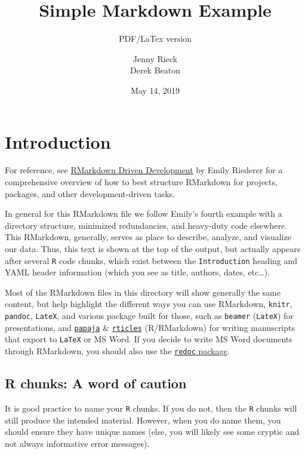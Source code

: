 \documentclass[]{article}
\title{Simple Markdown Example}
\subtitle{PDF/LaTex version}
\author{Jenny Rieck \\ Derek Beaton}
\date{May 14, 2019}
\begin{document}
\maketitle

\hypertarget{introduction}{%
\section{Introduction}\label{introduction}}

For reference, see
\href{https://emilyriederer.netlify.com/post/rmarkdown-driven-development/}{RMarkdown
Driven Development} by Emily Riederer for a comprehensive overview of
how to best structure RMarkdown for projects, packages, and other
development-driven tasks.

In general for this RMarkdown file we follow Emily's fourth example with
a directory structure, minimized redundancies, and heavy-duty code
elsewhere. This RMarkdown, generally, serves as place to describe,
analyze, and visualize our data. Thus, this text is shown at the top of
the output, but actually appears after several \texttt{R} code chunks,
which exist between the \texttt{Introduction} heading and YAML header
information (which you see as title, authors, dates, etc\ldots{}).

Most of the RMarkdown files in this directory will show generally the
same content, but help highlight the different ways you can use
RMarkdown, \texttt{knitr}, \texttt{pandoc}, \texttt{LateX}, and various
package built for those, such as \texttt{beamer} (\texttt{LateX}) for
presentations, and
\href{https://github.com/crsh/papaja}{\texttt{papaja}} \&
\href{https://github.com/rstudio/rticles}{\texttt{rticles}}
(R/RMarkdown) for writing manuscripts that export to \texttt{LaTeX} or
MS Word. If you decide to write MS Word documents through RMarkdown, you
should also use the
\href{https://github.com/noamross/redoc}{\texttt{redoc} package}.

\hypertarget{r-chunks-a-word-of-caution}{%
\subsection{R chunks: A word of
caution}\label{r-chunks-a-word-of-caution}}

It is good practice to name your \texttt{R} chunks. If you do not, then
the \texttt{R} chunks will still produce the intended material. However,
when you do name them, you should ensure they have unique names (else,
you will likely see some cryptic and not always informative error
messages).
\end{document}
